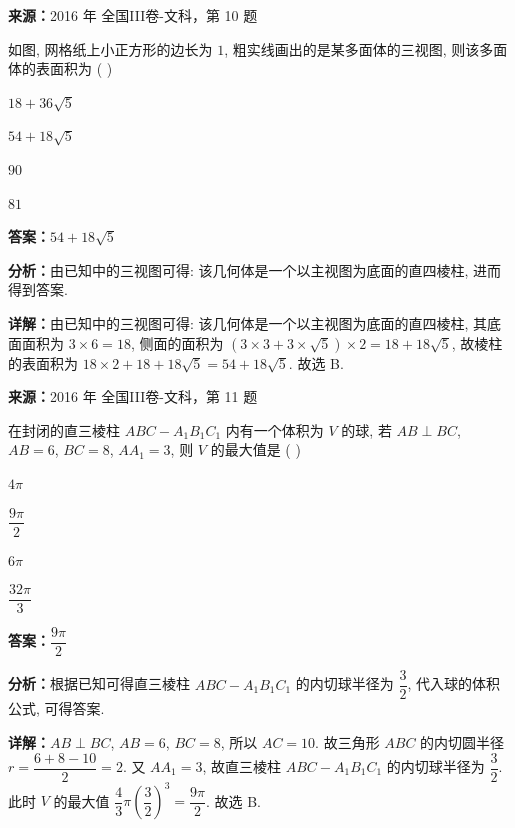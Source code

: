 \begin{question}[points=5]
\textbf{来源：}2016 年 全国III卷-文科，第 10 题\par
如图, 网格纸上小正方形的边长为 $1$, 粗实线画出的是某多面体的三视图, 则该多面体的表面积为 ( )
\begin{choices}
  \item $18+36\sqrt{5}$
  \item $54+18\sqrt{5}$
  \item $90$
  \item $81$
\end{choices}
\begin{solution}
\textbf{答案：}$54+18\sqrt{5}$

\textbf{分析：}由已知中的三视图可得: 该几何体是一个以主视图为底面的直四棱柱, 进而得到答案.

\textbf{详解：}由已知中的三视图可得: 该几何体是一个以主视图为底面的直四棱柱, 其底面面积为 $3\times6=18$, 侧面的面积为 $(3\times3+3\times\sqrt{5})\times2=18+18\sqrt{5}$, 故棱柱的表面积为 $18\times2+18+18\sqrt{5}=54+18\sqrt{5}$. 故选 B.
\end{solution}
\end{question}

\begin{question}[points=5]
\textbf{来源：}2016 年 全国III卷-文科，第 11 题\par
在封闭的直三棱柱 $ABC-A_1B_1C_1$ 内有一个体积为 $V$ 的球, 若 $AB\perp BC$, $AB=6$, $BC=8$, $AA_1=3$, 则 $V$ 的最大值是 ( )
\begin{choices}
  \item $4\pi$
  \item $\dfrac{9\pi}{2}$
  \item $6\pi$
  \item $\dfrac{32\pi}{3}$
\end{choices}
\begin{solution}
\textbf{答案：}$\dfrac{9\pi}{2}$

\textbf{分析：}根据已知可得直三棱柱 $ABC-A_1B_1C_1$ 的内切球半径为 $\dfrac{3}{2}$, 代入球的体积公式, 可得答案.

\textbf{详解：}$AB\perp BC$, $AB=6$, $BC=8$, 所以 $AC=10$. 故三角形 $ABC$ 的内切圆半径 $r=\dfrac{6+8-10}{2}=2$. 又 $AA_1=3$, 故直三棱柱 $ABC-A_1B_1C_1$ 的内切球半径为 $\dfrac{3}{2}$. 此时 $V$ 的最大值 $\dfrac{4}{3}\pi\left(\dfrac{3}{2}\right)^3=\dfrac{9\pi}{2}$. 故选 B.
\end{solution}
\end{question}

